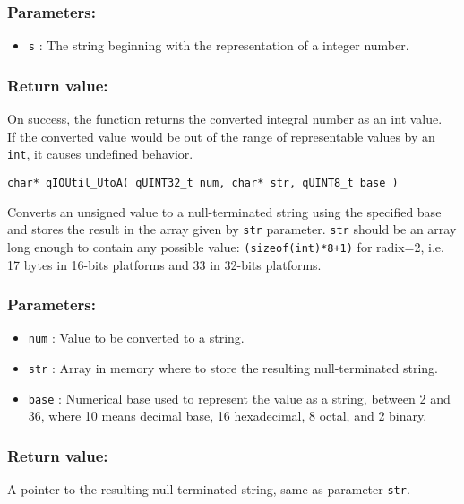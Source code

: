 \subsubsection*{Parameters:}
\begin{itemize}
    \item \lstinline{s} : The string beginning with the representation of a integer number.

\end{itemize}

\subsubsection*{Return value:}
On success, the function returns the converted integral number as an int value. \\
If the converted value would be out of the range of representable values by an \lstinline{int}, it causes undefined behavior.


\noindent\hrulefill

\begin{lstlisting}[style=CStyle]
char* qIOUtil_UtoA( qUINT32_t num, char* str, qUINT8_t base )
\end{lstlisting}

Converts an unsigned value to a null-terminated string using the specified base and stores the result in the array given by \lstinline{str} parameter. \lstinline{str} should be an array long enough to contain any possible value: \lstinline{(sizeof(int)*8+1)} for radix=2, i.e. 17 bytes in 16-bits platforms and 33 in 32-bits platforms. 

\subsubsection*{Parameters:}
\begin{itemize}
    \item \lstinline{num} : Value to be converted to a string.
    \item \lstinline{str} : Array in memory where to store the resulting null-terminated string.
    \item \lstinline{base} : Numerical base used to represent the value as a string, between 2 and 36, where 10 means decimal base, 16 hexadecimal, 8 octal, and 2 binary.
\end{itemize}

\subsubsection*{Return value:}
A pointer to the resulting null-terminated string, same as parameter \lstinline{str}.


